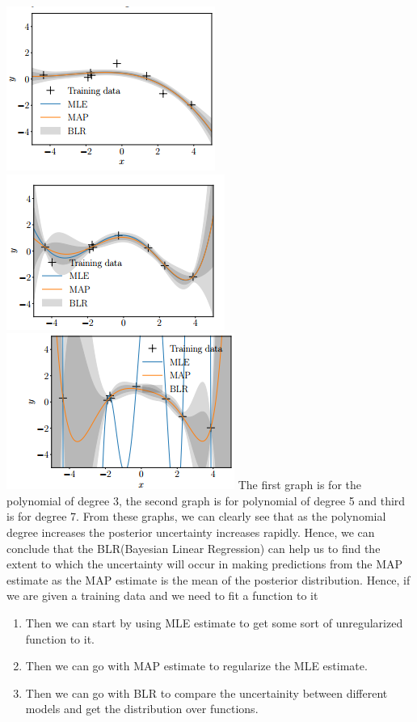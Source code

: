 \documentclass[12pt]{article}
\numberwithin{equation}{section}
\begin{document}
{\includegraphics[scale=0.9]{graph19}
\includegraphics[scale=0.9]{graph20}
\includegraphics[scale=0.9]{graph21}
The first graph is for the polynomial of degree 3, the second graph is for polynomial of degree 5 and third is for degree 7. From these graphs, we can clearly see that as the polynomial degree increases the posterior uncertainty increases rapidly. Hence, we can conclude that the BLR(Bayesian Linear Regression) can help us to find the extent to which the uncertainty will occur in making predictions from the MAP estimate as the MAP estimate is the mean of the posterior distribution. Hence, if we are given a training data and we need to fit a function to it
\begin{enumerate}
	\item Then we can start by using MLE estimate to get some sort of unregularized function to it.
	\item Then we can go with MAP estimate to regularize the MLE estimate.
	\item Then we can go with BLR to compare the uncertainity between different models and get the distribution over functions.
\end{enumerate}
}
\end{document}

